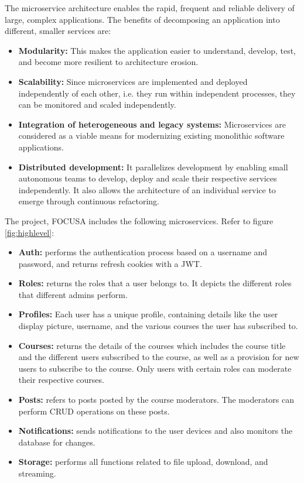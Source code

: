 The microservice architecture enables the rapid, frequent and reliable delivery of large, complex applications.
The benefits of decomposing an application into different, smaller services are:
\begin{itemize}
    \item \textbf{Modularity:} This makes the application easier to understand, develop, test, and become more resilient to architecture erosion.
    \item \textbf{Scalability:} Since microservices are implemented and deployed independently of each other, i.e. they run within independent processes, they can be monitored and scaled independently.
    \item \textbf{Integration of heterogeneous and legacy systems:} Microservices are considered as a 
    viable means for modernizing existing monolithic software applications.
    \item \textbf{Distributed development:} It parallelizes development by enabling small autonomous teams to develop, deploy and scale their respective services independently. It also allows the architecture of an individual service to emerge through continuous refactoring.
\end{itemize}

The project, FOCUSA includes the following microservices. Refer to figure \ref{fig:highlevel}:
\begin{itemize}
    \item \textbf{Auth:} performs the authentication process based on a username and password, and returns refresh cookies with a JWT.
    \item \textbf{Roles:}  returns the roles that a user belongs to. It depicts the different roles that different admins perform.
    \item \textbf{Profiles:} Each user has a unique profile, containing details like the user display picture, username, and the various courses the user has subscribed to.
    \item \textbf{Courses:}  returns the details of the courses which includes the course title and the different users subscribed to the course, as well as a provision for new users to subscribe to the course. Only users with certain roles can moderate their respective courses.
    \item \textbf{Posts:} refers to posts posted by the course moderators. The moderators can perform CRUD operations on these posts.
    \item \textbf{Notifications:}  sends notifications to the user devices and also monitors the database for changes.
    \item \textbf{Storage:} performs all functions related to file upload, download, and streaming.
\end{itemize}

